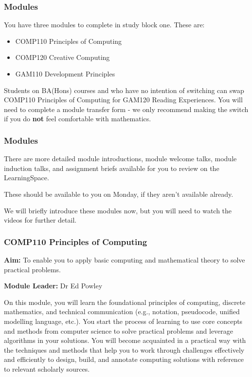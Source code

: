 \begin{frame}
	\frametitle{Modules}
	
	You have three modules to complete in study block one. These are:
	
	\vspace{0.5em}
	
	\begin{itemize}
		\item COMP110 Principles of Computing
		\item COMP120 Creative Computing
		\item GAM110 Development Principles
	\end{itemize}
	
	\vspace{1em}
	
	Students on BA(Hons) courses and who have no intention of switching can swap COMP110 Principles of Computing for GAM120 Reading Experiences. You will need to complete a module transfer form - we only recommend making the switch if you do \textbf{not} feel comfortable with mathematics.
	
\end{frame}

\begin{frame}
	\frametitle{Modules}
	
	There are more detailed module introductions, module welcome talks, module induction talks, and assignment briefs available for you to review on the LearningSpace.
	
	\vspace{0.5em}
	
	These should be available to you on Monday, if they aren't available already.
	
	\vspace{0.5em}
	
	We will briefly introduce these modules now, but you will need to watch the videos for further detail.
	
\end{frame}

\begin{frame}
	\frametitle{COMP110 Principles of Computing}
		
	\small{\textbf{Aim:} To enable you to apply basic computing and mathematical theory to solve practical problems.}
		\vspace{0.5em}
	
	\small{\textbf{Module Leader:} Dr Ed Powley}	
	
		\vspace{0.5em}
	
\footnotesize{On this module, you will learn the foundational principles of computing, discrete mathematics, and technical communication (e.g., notation, pseudocode, unified modelling language, etc.). You start the process of learning to use core concepts and methods from computer science to solve practical problems and leverage algorithms in your solutions. You will become acquainted in a practical way with the techniques and methods that help you to work through challenges effectively and efficiently to design, build, and annotate computing solutions with reference to relevant scholarly sources.}
	
\end{frame}

